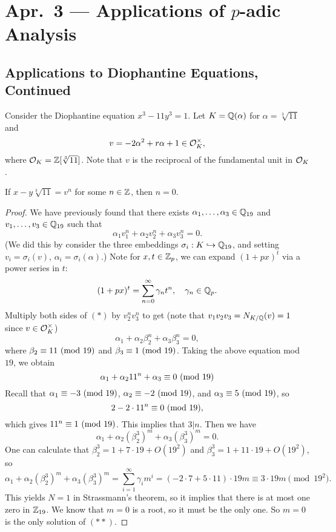 \chapter{Apr.~3 --- Applications of \texorpdfstring{$p$}{p}-adic Analysis}

\section{Applications to Diophantine Equations, Continued}

\begin{example}
  Consider the Diophantine equation
  $x^3 - 11y^3 = 1$. Let $K = \mathbb{Q}(\alpha)$ for
  $\alpha = \sqrt[3]{11}$ and
  \[
    v = -2\alpha^2 + r\alpha + 1 \in \mathcal{O}_K^\times,
  \]
  where $\mathcal{O}_K = \mathbb{Z}[\sqrt[3]{11}]$. Note
  that $v$ is the reciprocal of the fundamental
  unit in $\mathcal{O}_K$.
\end{example}

\begin{prop}
  If $x - y \sqrt[3]{11} = v^n$ for some $n \in \mathbb{Z}$,
  then $n = 0$.
\end{prop}

\begin{proof}
  We have previously found that there exists
  $\alpha_1, \dots, \alpha_3 \in \mathbb{Q}_{19}$ and
  $v_1, \dots, v_3 \in \mathbb{Q}_{19}$ such that
  \[
    \alpha_1 v_1^n + \alpha_2 v_2^n + \alpha_3 v_3^n = 0. \tag{$*$}
  \]
  (We did this by consider the three embeddings
  $\sigma_i : K \hookrightarrow \mathbb{Q}_{19}$, and
  setting $v_i = \sigma_i(v)$, $\alpha_i = \sigma_i(\alpha)$.)
  Note for $x, t \in \mathbb{Z}_p$, we can expand
  $(1 + px)^t$ via a power series in $t$:
  \[
    (1 + px)^t = \sum_{n = 0}^\infty \gamma_n t^n, \quad \gamma_n \in \mathbb{Q}_p.
  \]
  Multiply both sides of $(*)$ by $v_2^n v_3^n$ to
  get (note that $v_1 v_2 v_3 = N_{K / \mathbb{Q}}(v) = 1$
  since $v \in \mathcal{O}_K^\times$)
  \[
    \alpha_1 + \alpha_2 \beta_2^n + \alpha_3 \beta_3^n = 0,
  \]
  where $\beta_2 \equiv 11 \ (\mathrm{mod}\ 19)$ and
  $\beta_3 \equiv 1 \ (\mathrm{mod}\ 19)$. Taking the
  above equation mod $19$, we obtain
  \[
    \alpha_1 + \alpha_2 11^n + \alpha_3 \equiv 0 \ (\mathrm{mod}\ 19)
  \]
  Recall that
  $\alpha_1 \equiv -3 \ (\mathrm{mod}\ 19)$,
  $\alpha_2 \equiv -2 \ (\mathrm{mod}\ 19)$, and
  $\alpha_3 \equiv 5 \ (\mathrm{mod}\ 19)$, so
  \[
    2 - 2 \cdot 11^n \equiv 0 \ (\mathrm{mod}\ 19),
  \]
  which gives $11^n \equiv 1 \ (\mathrm{mod}\ 19)$. This
  implies that $3 | n$. Then we have
  \[
    \alpha_1 + \alpha_2 (\beta_2^3)^m + \alpha_3(\beta_3^3)^m = 0. \tag{$**$}
  \]
  One can calculate that $\beta_2^3 = 1 + 7 \cdot 19 + O(19^2)$ and
  $\beta_3^3 = 1 + 11 \cdot 19 + O(19^2)$, so
  \[
    \alpha_1 + \alpha_2(\beta_2^3)^m + \alpha_3(\beta_3^3)^m = \sum_{i = 1}^\infty \gamma_i m^i
    = (-2 \cdot 7 + 5 \cdot 11) \cdot 19m
    \equiv 3 \cdot 19m \pmod{19^2}.
  \]
  This yields $N = 1$ in Strassmann's theorem,
  so it implies that there is at most one zero
  in $\mathbb{Z}_{19}$. We know that $m = 0$ is a root,
  so it must be the only one. So
  $m = 0$ is the only solution of $(**)$.
\end{proof}

